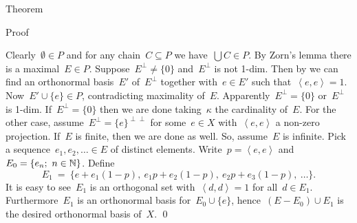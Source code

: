 \documentclass[b]{subfiles}
\begin{document}
\begin{parsec}
\begin{point}{Theorem}
\begin{point}{Proof}
\begin{point}
\begin{inparaenum}
\end{inparaenum}
Clearly~$\emptyset\in P$
and for any chain~$C \subseteq P$
    we have~$\bigcup C \in P$.
By Zorn's lemma there is a maximal~$E \in P$.
Suppose~$E^\perp \neq \{0\}$ and~$E^\perp$ is not 1-dim.
Then by 
    we can find an orthonormal basis~$E'$ of~$E^\perp$
    together with~$e \in E'$ such that~$\left<e,e\right>=1$.
Now~$E' \cup \{e\} \in P$, contradicting maximality of~$E$.
Apparently~$E^\perp = \{0\}$ or~$E^\perp$ is 1-dim.
If~$E^\perp = \{0\}$
    then we are done
    taking~$\kappa$ the cardinality of~$E$.
For the other case, assume~$E^\perp = \{e\}^{\perp\perp}$
    for some~$e \in X$ with~$\left<e,e\right>$ a non-zero projection.
If~$E$ is finite, then we are done as well.
So, assume~$E$ is infinite.
Pick a sequence~$e_1, e_2, \ldots \in E$ of distinct elements.
Write~$p = \left<e,e\right>$
    and~$E_0 = \{e_n;\ n\in \mathbb{N}\}$.
Define
\begin{equation*}
    E_1 \ =\  \{e + e_1(1-p), \ e_1p + e_2(1-p),\  e_2p  +e_3(1-p),\  \ldots \}.
\end{equation*}
It is easy to see~$E_1$ is an orthogonal set
    with~$\left<d,d\right>=1$ for all~$d \in E_1$.
Furthermore~$E_1$ is an orthonormal basis for~$E_0 \cup \{e\}$,
    hence~$(E - E_0) \cup E_1$ is the desired orthonormal basis of~$X$. \qed
\end{point}
\end{point}
\end{point}
\end{parsec}
\end{document}
